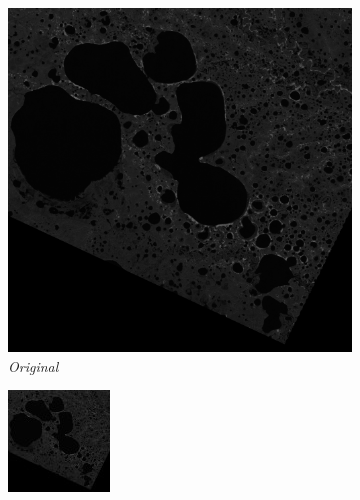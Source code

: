 \documentclass[10pt]{article}
\begin{document}
\begin{figure}
  \centering
  \begin{subfigure}{0.22\textwidth}
      \centering
      \includegraphics[width=\linewidth]{original_good.jpg}
      \caption{\textit{Original}}
      \label{fig:image_1}
  \end{subfigure}
  \hfill
  \begin{subfigure}{0.22\textwidth}
      \centering
      \includegraphics[width=\linewidth]{rescale_good.jpg}

\end{subfigure}
\end{figure}
\end{document}

